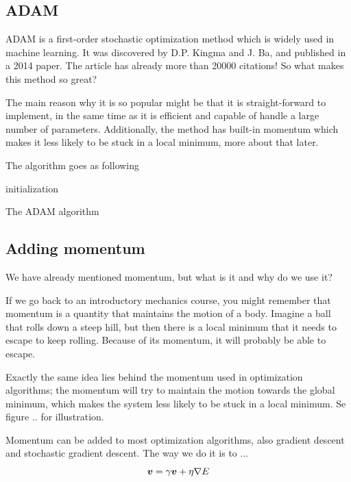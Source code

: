 \subsection{ADAM}
ADAM is a first-order stochastic optimization method which is widely used in machine learning. It was discovered by D.P. Kingma and J. Ba, and published in a 2014 paper. The article has already more than 20000 citations! \cite{kingma_adam:_2014} So what makes this method so great? 

The main reason why it is so popular might be that it is straight-forward to implement, in the same time as it is efficient and capable of handle a large number of parameters. Additionally, the method has built-in momentum which makes it less likely to be stuck in a local minimum, more about that later.

The algorithm goes as following

\begin{algorithm}[H]
\SetAlgoLined
{}
initialization\;
\caption{The ADAM algorithm}
\end{algorithm}

\subsection{Adding momentum}
We have already mentioned momentum, but what is it and why do we use it?

If we go back to an introductory mechanics course, you might remember that momentum is a quantity that maintains the motion of a body. Imagine a ball that rolls down a steep hill, but then there is a local minimum that it needs to escape to keep rolling. Because of its momentum, it will probably be able to escape. 

Exactly the same idea lies behind the momentum used in optimization algorithms; the momentum will try to maintain the motion towards the global minimum, which makes the system less likely to be stuck in a local minimum. Se figure .. for illustration. 

Momentum can be added to most optimization algorithms, also gradient descent and stochastic gradient descent. The way we do it is to ...
\begin{equation}
\boldsymbol{{v}} = \gamma\boldsymbol{{v}} + \eta\nabla E
\end{equation}

